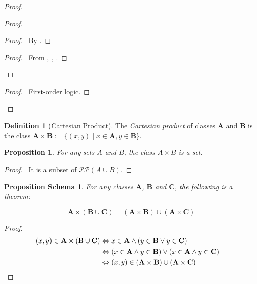 \documentclass{book}
\let\qed\relax
\newtheorem{prop}[ax]{Proposition}
\newtheorem{props}[ax]{Proposition Schema}
\theoremstyle{definition}
\newtheorem{df}[ax]{Definition}
\begin{document}
\begin{proof}
\pf
{}
\begin{proof}
	\begin{proof}
		\pf\ By .
	\end{proof}
	\begin{proof}
		\pf\ From , , .
	\end{proof}
\end{proof}
\begin{proof}
	\pf\ First-order logic.
\end{proof}
\qed
\end{proof}

\begin{df}[Cartesian Product]
The \emph{Cartesian product} of classes $\mathbf{A}$ and $\mathbf{B}$ is the class $\mathbf{A} \times \mathbf{B} := \{(x,y) \mid x \in \mathbf{A}, y \in \mathbf{B}\}$.
\end{df}

\begin{prop}
For any sets $A$ and $B$, the class $A \times B$ is a set.
\end{prop}

\begin{proof}
\pf\ It is a subset of $\mathcal{P} \mathcal{P} (A \cup B)$. \qed
\end{proof}

\begin{props}
For any classes $\mathbf{A}$, $\mathbf{B}$ and $\mathbf{C}$, the following is a theorem:

\[ \mathbf{A} \times (\mathbf{B} \cup \mathbf{C}) = (\mathbf{A} \times \mathbf{B}) \cup (\mathbf{A} \times \mathbf{C}) \]
\end{props}

\begin{proof}
\pf
\begin{align*}
(x,y) \in \mathbf{A} \times (\mathbf{B} \cup \mathbf{C}) & \Leftrightarrow x \in \mathbf{A} \wedge (y \in \mathbf{B} \vee y \in \mathbf{C}) \\
& \Leftrightarrow (x \in \mathbf{A} \wedge y \in \mathbf{B}) \vee (x \in \mathbf{A} \wedge y \in \mathbf{C}) \\
& \Leftrightarrow (x,y) \in (\mathbf{A} \times \mathbf{B}) \cup (\mathbf{A} \times \mathbf{C}) & \qed
\end{align*}
\end{proof}
\end{document}
